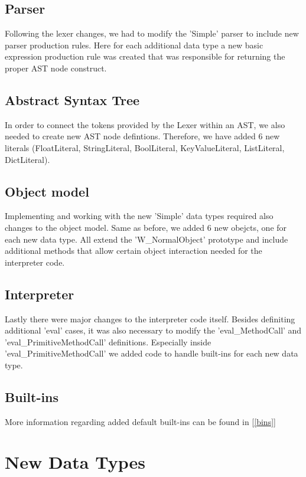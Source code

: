 \documentclass{article}
\begin{document}
\subsection{Parser}
Following the lexer changes, we had to modify the 'Simple' parser to include new parser production rules. Here for each additional data type a new basic expression production rule was created that was responsible for returning the proper AST node construct.

\subsection{Abstract Syntax Tree}
In order to connect the tokens provided by the Lexer within an AST, we also needed to create new AST node defintions. Therefore, we have added 6 new literals (FloatLiteral, StringLiteral, BoolLiteral, KeyValueLiteral, ListLiteral, DictLiteral).

\subsection{Object model}
Implementing and working with the new 'Simple' data types required also changes to the object model. Same as before, we added 6 new obejcts, one for each new data type. All extend the 'W\_NormalObject' prototype and include additional methods that allow certain object interaction needed for the interpreter code.

\subsection{Interpreter}
Lastly there were major changes to the interpreter code itself. Besides definiting additional 'eval' cases, it was also necessary to modify the 'eval\_MethodCall' and 'eval\_PrimitiveMethodCall' definitions. Especially inside 'eval\_PrimitiveMethodCall' we added code to handle built-ins for each new data type.


\subsection{Built-ins}
More information regarding added default built-ins can be found in [\ref{bins}]


\section{New Data Types}
\end{document}
